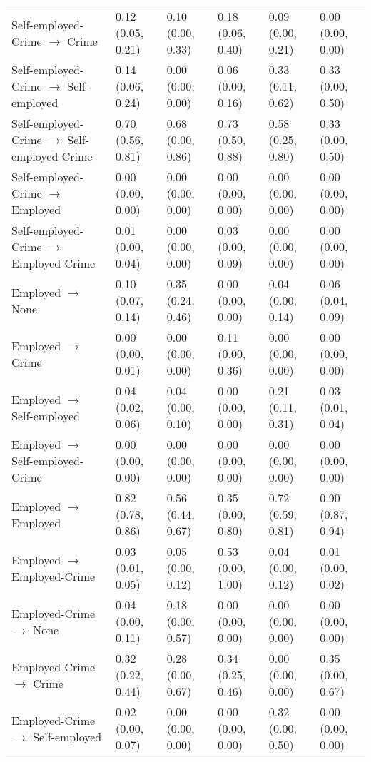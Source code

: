 \begin{scriptsize}
{\begin{longtable}{llllll}
  \quad Self-employed-Crime $\rightarrow$ Crime & 0.12 (0.05, 0.21) & 0.10 (0.00, 0.33) & 0.18 (0.06, 0.40) & 0.09 (0.00, 0.21) & 0.00 (0.00, 0.00) \\ 
  \quad Self-employed-Crime $\rightarrow$ Self-employed & 0.14 (0.06, 0.24) & 0.00 (0.00, 0.00) & 0.06 (0.00, 0.16) & 0.33 (0.11, 0.62) & 0.33 (0.00, 0.50) \\ 
  \quad Self-employed-Crime $\rightarrow$ Self-employed-Crime & 0.70 (0.56, 0.81) & 0.68 (0.00, 0.86) & 0.73 (0.50, 0.88) & 0.58 (0.25, 0.80) & 0.33 (0.00, 0.50) \\ 
  \quad Self-employed-Crime $\rightarrow$ Employed & 0.00 (0.00, 0.00) & 0.00 (0.00, 0.00) & 0.00 (0.00, 0.00) & 0.00 (0.00, 0.00) & 0.00 (0.00, 0.00) \\ 
  \quad Self-employed-Crime $\rightarrow$ Employed-Crime & 0.01 (0.00, 0.04) & 0.00 (0.00, 0.00) & 0.03 (0.00, 0.09) & 0.00 (0.00, 0.00) & 0.00 (0.00, 0.00) \\ 
   \addlinespace[12pt] 
\quad Employed $\rightarrow$ None & 0.10 (0.07, 0.14) & 0.35 (0.24, 0.46) & 0.00 (0.00, 0.00) & 0.04 (0.00, 0.14) & 0.06 (0.04, 0.09) \\ 
  \quad Employed $\rightarrow$ Crime & 0.00 (0.00, 0.01) & 0.00 (0.00, 0.00) & 0.11 (0.00, 0.36) & 0.00 (0.00, 0.00) & 0.00 (0.00, 0.00) \\ 
  \quad Employed $\rightarrow$ Self-employed & 0.04 (0.02, 0.06) & 0.04 (0.00, 0.10) & 0.00 (0.00, 0.00) & 0.21 (0.11, 0.31) & 0.03 (0.01, 0.04) \\ 
  \quad Employed $\rightarrow$ Self-employed-Crime & 0.00 (0.00, 0.00) & 0.00 (0.00, 0.00) & 0.00 (0.00, 0.00) & 0.00 (0.00, 0.00) & 0.00 (0.00, 0.00) \\ 
  \quad Employed $\rightarrow$ Employed & 0.82 (0.78, 0.86) & 0.56 (0.44, 0.67) & 0.35 (0.00, 0.80) & 0.72 (0.59, 0.81) & 0.90 (0.87, 0.94) \\ 
  \quad Employed $\rightarrow$ Employed-Crime & 0.03 (0.01, 0.05) & 0.05 (0.00, 0.12) & 0.53 (0.00, 1.00) & 0.04 (0.00, 0.12) & 0.01 (0.00, 0.02) \\ 
   \addlinespace[12pt] 
\quad Employed-Crime $\rightarrow$ None & 0.04 (0.00, 0.11) & 0.18 (0.00, 0.57) & 0.00 (0.00, 0.00) & 0.00 (0.00, 0.00) & 0.00 (0.00, 0.00) \\ 
  \quad Employed-Crime $\rightarrow$ Crime & 0.32 (0.22, 0.44) & 0.28 (0.00, 0.67) & 0.34 (0.25, 0.46) & 0.00 (0.00, 0.00) & 0.35 (0.00, 0.67) \\ 
  \quad Employed-Crime $\rightarrow$ Self-employed & 0.02 (0.00, 0.07) & 0.00 (0.00, 0.00) & 0.00 (0.00, 0.00) & 0.32 (0.00, 0.50) & 0.00 (0.00, 0.00) \\ 

\end{longtable}}
\end{scriptsize}
